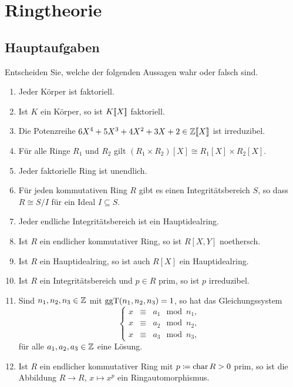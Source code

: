 \section{Ringtheorie}





\subsection{Hauptaufgaben}


\begin{question}[subtitle = Wahr oder Falsch?]
  Entscheiden Sie, welche der folgenden Aussagen wahr oder falsch sind.
  \begin{enumerate}
    \item
      Jeder Körper ist faktoriell.
    \item
      Ist $K$ ein Körper, so ist $K[\![X]\!]$ faktoriell.
    \item
      Die Potenzreihe $6X^4 + 5X^3 + 4X^2 + 3X + 2 \in \mathbb{Z}[\![X]\!]$ ist irreduzibel.    
    \item
      Für alle Ringe $R_1$ und $R_2$ gilt $(R_1 \times R_2)[X] \cong R_1[X] \times R_2[X]$.
    \item
      Jeder faktorielle Ring ist unendlich.
    \item
      Für jeden kommutativen Ring $R$ gibt es einen Integritätsbereich $S$, so dass $R \cong S/I$ für ein Ideal $I \subseteq S$.
    \item
      Jeder endliche Integritätsbereich ist ein Hauptidealring.
    \item
      Ist $R$ ein endlicher kommutativer Ring, so ist $R[X,Y]$ noethersch.
    \item
      Ist $R$ ein Hauptidealring, so ist auch $R[X]$ ein Hauptidealring.
    \item
      Ist $R$ ein Integritätsbereich und $p \in R$ prim, so ist $p$ irreduzibel.
    \item
      Sind $n_1, n_2, n_3 \in \mathbb{Z}$ mit $\operatorname{ggT}(n_1, n_2, n_3) = 1$, so hat das Gleichungssystem
      \[
        \left\{
          \begin{array}{ccc}
            x &\equiv&  a_1 \mod n_1,
            \\
            x &\equiv&  a_2 \mod n_2,
            \\
            x &\equiv&  a_3 \mod n_3,
          \end{array}
        \right.
      \]
      für alle $a_1, a_2, a_3 \in \mathbb{Z}$ eine Lösung.
    \item
      Ist $R$ ein endlicher kommutativer Ring mit $p \coloneqq \operatorname{char} R > 0$ prim, so ist die Abbildung $R \to R$, $x \mapsto x^p$ ein Ringautomorphismus.
  \end{enumerate}
\end{question}


